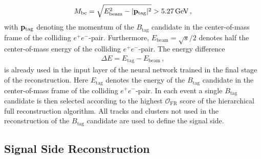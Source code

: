 \documentclass[twocolumn,aps,prd,superscriptaddress,nofootinbib,floatfix,preprintnumbers,a4]{revtex4-1}
\begin{document}
\begin{align}
 M_{\mathrm{bc}} = \sqrt{ E_{\mathrm{beam}}^2 - | \bold{p}_{\mathrm{tag}}|^2 }  > 5.27 \, \text{GeV} \, ,
\end{align}
with $ \bold{p}_{\mathrm{tag}}$ denoting the momentum of the $B_{\mathrm{tag}}$ candidate in the center-of-mass frame of the colliding $e^+e^-$-pair. Furthermore, $E_{\mathrm{beam}} = \sqrt{s}/2$ denotes half the center-of-mass energy of the colliding $e^+e^-$-pair. The energy difference
\begin{align}
  \Delta E = E_{\mathrm{tag}} - E_{\mathrm{beam}} \, ,
\end{align}
is already used in the input layer of the neural network trained in the final stage of the reconstruction. Here $E_{\mathrm{tag}}$ denotes the energy of the $B_{\mathrm{tag}}$ candidate in the center-of-mass frame of the colliding $e^+e^-$-pair. In each event a single $B_{\mathrm{tag}}$ candidate is then selected according to the highest $\mathcal{O}_{\mathrm{FR}}$ score of the hierarchical full reconstruction algorithm. All tracks and clusters not used in the reconstruction of the $B_{\mathrm{tag}}$ candidate are used to define the signal side. 

\subsection{Signal Side Reconstruction}
\end{document}
